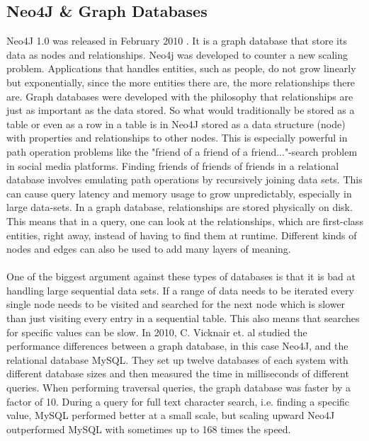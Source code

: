 \documentclass{cslthse-msc}
\begin{document}
\subsection{Neo4J \& Graph Databases}
Neo4J 1.0 was released in February 2010 \cite{Neo4J10}. It is a graph database that store its data as nodes and relationships. Neo4j was developed to counter a new scaling problem. Applications that handles entities, such as people, do not grow linearly but exponentially, since the more entities there are, the more relationships there are. Graph databases were developed with the philosophy that relationships are just as important as the data stored. So what would traditionally be stored as a table or even as a row in a table is in Neo4J stored as a data structure (node) with properties and relationships to other nodes. This is especially powerful in path operation problems like the "friend of a friend of a friend..."-search problem in social media platforms. Finding friends of friends of friends in a relational database involves emulating path operations by recursively joining data sets. This can cause query latency and memory usage to grow unpredictably, especially in large data-sets. In a graph database, relationships are stored physically on disk. This means that in a query, one can look at the relationships, which are first-class entities, right away, instead of having to find them at runtime. Different kinds of nodes and edges can also be used to add many layers of meaning. \\\\
One of the biggest argument against these types of databases is that it is bad at handling large sequential data sets. If a range of data needs to be iterated every single node needs to be visited and searched for the next node which is slower than just visiting every entry in a sequential table. This also means that searches for specific values can be slow. In 2010, C. Vicknair et. al \cite{vicknair2010comparison} studied the performance differences between a graph database, in this case Neo4J, and the relational database MySQL. They set up twelve databases of each system with different database sizes and then measured the time in milliseconds of different queries. When performing traversal queries, the graph database was faster by a factor of 10. During a query for full text character search, i.e. finding a specific value, MySQL performed better at a small scale, but scaling upward Neo4J outperformed MySQL with sometimes up to 168 times the speed.
\end{document}
